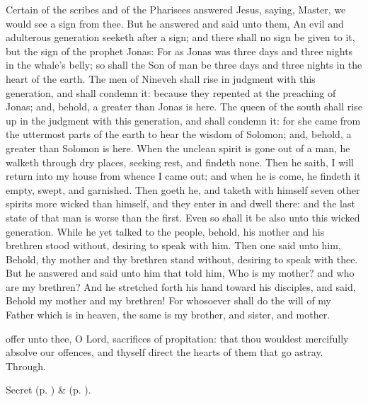  Certain of the scribes and of the Pharisees answered Jesus, saying, Master, we would see a sign from thee. But he answered and said unto them, An evil and adulterous generation seeketh after a sign; and there shall no sign be given to it, but the sign of the prophet Jonas: For as Jonas was three days and three nights in the whale's belly; so shall the Son of man be three days and three nights in the heart of the earth. The men of Nineveh shall rise in judgment with this generation, and shall condemn it: because they repented at the preaching of Jonas; and, behold, a greater than Jonas is here. The queen of the south shall rise up in the judgment with this generation, and shall condemn it: for she came from the uttermost parts of the earth to hear the wisdom of Solomon; and, behold, a greater than Solomon is here. When the unclean spirit is gone out of a man, he walketh through dry places, seeking rest, and findeth none. Then he saith, I will return into my house from whence I came out; and when he is come, he findeth it empty, swept, and garnished. Then goeth he, and taketh with himself seven other spirits more wicked than himself, and they enter in and dwell there: and the last state of that man is worse than the first. Even so shall it be also unto this wicked generation. While he yet talked to the people, behold, his mother and his brethren stood without, desiring to speak with him. Then one said unto him, Behold, thy mother and thy brethren stand without, desiring to speak with thee. But he answered and said unto him that told him, Who is my mother? and who are my brethren? And he stretched forth his hand toward his disciples, and said, Behold my mother and my brethren! For whosoever shall do the will of my Father which is in heaven, the same is my brother, and sister, and mother.


\vspace{-0.25\baselineskip}

\secret
{} offer unto thee, O Lord, sacrifices of propitation: that thou wouldest mercifully absolve our offences, and thyself direct the hearts of them that go astray. Through.

\begin{rubric}
     Secret  (p. \pageref{AshWednesdayMassSecret}) \&   (p. \pageref{SPLivingDeparted}).
\end{rubric}

